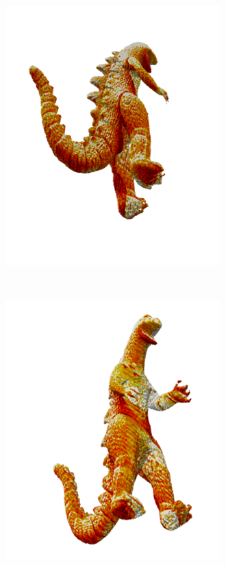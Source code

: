 \begin{figure}[ht]
  \begin{subfigure}[b]{0.4\textwidth}
    \centering
    \includegraphics[width=\textwidth]{images/q2_dino_view_2.png}
    \caption{}
  \end{subfigure}
  \\
  \begin{subfigure}[b]{0.4\textwidth}
    \centering
    \includegraphics[width=\textwidth]{images/q2_dino_view_3.png}

\end{subfigure}
\end{figure}
